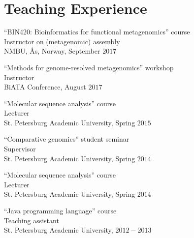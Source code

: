 \blankline

\section{Teaching Experience}
``BIN420: Bioinformatics for functional metagenomics'' course\\
Instructor on (metagenomic) assembly\\
NMBU, Ås, Norway, September $2017$

\blankline

``Methods for genome-resolved metagenomics'' workshop\\
Instructor\\
BiATA Conference, August $2017$

\blankline

``Molecular sequence analysis'' course\\
Lecturer\\
St. Petersburg Academic University, Spring $2015$

\blankline

``Comparative genomics'' student seminar\\
Supervisor\\
St. Petersburg Academic University, Spring $2014$

\blankline

``Molecular sequence analysis'' course\\
Lecturer\\
St. Petersburg Academic University, Spring $2014$

\blankline

``Java programming language'' course\\
Teaching assistant\\ 
St. Petersburg Academic University, $2012-2013$

